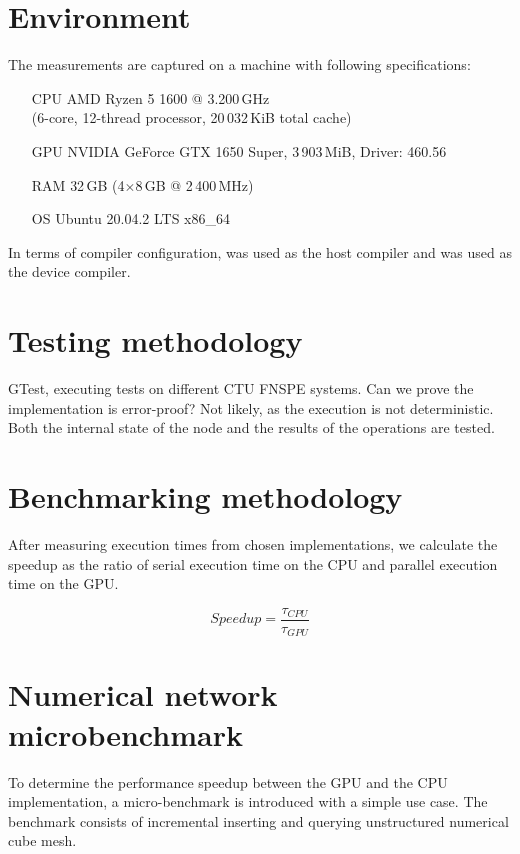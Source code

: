 \section{Environment}

The measurements are captured on a machine with following specifications:

\begin{itemize}
  \item[CPU]{AMD Ryzen 5 1600 @ 3.200\,GHz \\ (6-core, 12-thread processor, 20\,032\,KiB total cache)}
  \item[GPU]{NVIDIA GeForce GTX 1650 Super, 3\,903\,MiB, Driver: 460.56}
  \item[RAM]{32\,GB (4$\times$8\,GB @ 2\,400\,MHz)}
  \item[OS]{Ubuntu 20.04.2 LTS x86\_64}
\end{itemize}

In terms of compiler configuration,  was used as the host compiler and  was used as the device compiler.

\section{Testing methodology}

GTest, executing tests on different CTU FNSPE systems. Can we prove the implementation is error-proof? Not likely, as the execution is not deterministic. Both the internal state of the node and the results of the operations are tested.

\section{Benchmarking methodology}

After measuring execution times from chosen implementations, we calculate the speedup as the ratio of serial execution time on the CPU and parallel execution time on the GPU.

$$\mathit{Speedup} = \frac{\tau_{\mathit{CPU}}}{\tau_{\mathit{GPU}}}$$

\section{Numerical network microbenchmark}


To determine the performance speedup between the GPU and the CPU implementation, a micro-benchmark is introduced with a simple use case. The benchmark consists of incremental inserting and querying unstructured numerical cube mesh.


